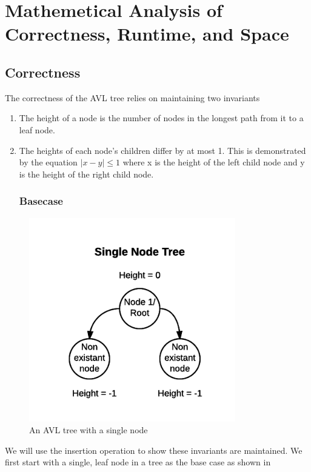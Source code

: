 \documentclass[12pt]{article}
\begin{document}
\section*{Mathemetical Analysis of Correctness, Runtime, and Space}

\subsection*{Correctness}
The correctness of the AVL tree relies on maintaining two invariants
\begin{enumerate}
  \item The height of a node is the number of nodes in the longest path from it
  to a leaf node.
  \item The heights of each node's children differ by at most 1.  This is
  demonstrated by the equation $|x-y| \le 1$ where x is the height of the left
  child node and y is the height of the right child node.
\subsubsection*{Basecase}
\end{enumerate}
\begin{figure}[h]
\caption{An AVL tree with a single node}
\includegraphics[width=9cm]{single_node_tree.png}
\centering
\end{figure}
\noindent
We will use the insertion operation to show these invariants are maintained. 
We first start with a single, leaf node in a tree as the base case as shown in
\end{document}
